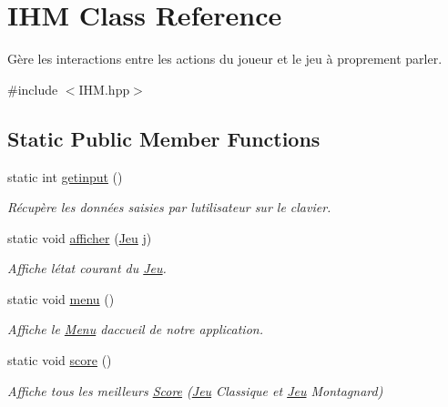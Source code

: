 \hypertarget{classIHM}{}\section{I\+HM Class Reference}
\label{classIHM}


Gère les interactions entre les actions du joueur et le jeu à proprement parler.  




{\ttfamily \#include $<$I\+H\+M.\+hpp$>$}

\subsection*{Static Public Member Functions}
\begin{DoxyCompactItemize}
\item 
static int \hyperlink{classIHM_a87654cde450f04cacddaf7a781f5300c}{getinput} ()
\begin{DoxyCompactList}\small\item\em Récupère les données saisies par l\textquotesingle{}utilisateur sur le clavier. \end{DoxyCompactList}\item 
\mbox{\label{classIHM_af818ed3206db32982e26f4706699f6f3}} 
static void \hyperlink{classIHM_af818ed3206db32982e26f4706699f6f3}{afficher} (\hyperlink{classJeu}{Jeu} j)
\begin{DoxyCompactList}\small\item\em Affiche l\textquotesingle{}état courant du \hyperlink{classJeu}{Jeu}. \end{DoxyCompactList}\item 
\mbox{\label{classIHM_a05f1daa32a6db641f74c5d6083c33743}} 
static void \hyperlink{classIHM_a05f1daa32a6db641f74c5d6083c33743}{menu} ()
\begin{DoxyCompactList}\small\item\em Affiche le \hyperlink{classMenu}{Menu} d\textquotesingle{}accueil de notre application. \end{DoxyCompactList}\item 
\mbox{\label{classIHM_a79d4bc8301e8a664c9bfea8d0b2ca916}} 
static void \hyperlink{classIHM_a79d4bc8301e8a664c9bfea8d0b2ca916}{score} ()
\begin{DoxyCompactList}\small\item\em Affiche tous les meilleurs \hyperlink{classScore}{Score} (\hyperlink{classJeu}{Jeu} Classique et \hyperlink{classJeu}{Jeu} Montagnard) \end{DoxyCompactList}\item 

\end{DoxyCompactItemize}
